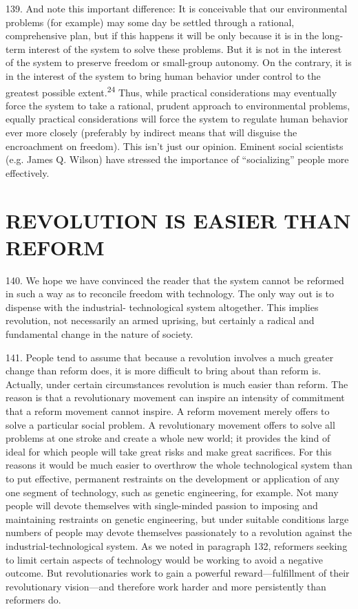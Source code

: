 \documentclass{article}
\begin{document}
139. And note this important difference: It is conceivable that our environmental problems (for 
example) may some day be settled through a rational, comprehensive plan, but if this happens it 
will be only because it is in the long-term interest of the system to solve these problems. But it is 
not in the interest of the system to preserve freedom or small-group autonomy. On the contrary, 
it is in the interest of the system to bring human behavior under control to the greatest possible 
extent.\textsuperscript{24} Thus, while practical considerations may eventually force the system to take a rational, 
prudent approach to environmental problems, equally practical considerations will force the 
system to regulate human behavior ever more closely (preferably by indirect means that will 
disguise the encroachment on freedom). This isn’t just our opinion. Eminent social scientists 
(e.g. James Q. Wilson) have stressed the importance of “socializing” people more effectively. 


\section{REVOLUTION IS EASIER THAN REFORM}

\hspace{0.5cm} 140. We hope we have convinced the reader that the system cannot be reformed in such a way as 
to reconcile freedom with technology. The only way out is to dispense with the industrial-
technological system altogether. This implies revolution, not necessarily an armed uprising, but 
certainly a radical and fundamental change in the nature of society. \vspace{\baselineskip} 

141. People tend to assume that because a revolution involves a much greater change than reform 
does, it is more difficult to bring about than reform is. Actually, under certain circumstances 
revolution is much easier than reform. The reason is that a revolutionary movement can inspire 
an intensity of commitment that a reform movement cannot inspire. A reform movement merely 
offers to solve a particular social problem. A revolutionary movement offers to solve all problems 
at one stroke and create a whole new world; it provides the kind of ideal for which people will take 
great risks and make great sacrifices. For this reasons it would be much easier to overthrow the 
whole technological system than to put effective, permanent restraints on the development or 
application of any one segment of technology, such as genetic engineering, for example. Not many 
people will devote themselves with single-minded passion to imposing and maintaining restraints 
on genetic engineering, but under suitable conditions large numbers of people may devote 
themselves passionately to a revolution against the industrial-technological system. As we noted 
in paragraph 132, reformers seeking to limit certain aspects of technology would be working to 
avoid a negative outcome. But revolutionaries work to gain a powerful reward—fulfillment of 
their revolutionary vision—and therefore work harder and more persistently than reformers do. \vspace{\baselineskip} \newpage
\end{document}
